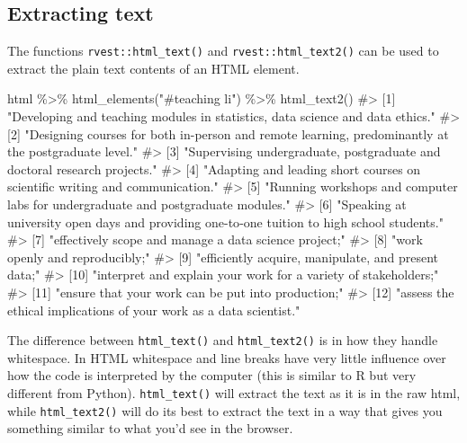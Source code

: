 \documentclass[
  letterpaper,
  DIV=11,
  numbers=noendperiod]{scrreprt}
\newenvironment{Shaded}{\begin{snugshade}}{\end{snugshade}}
\newcommand{\CommentTok}[1]{\textcolor[rgb]{0.37,0.37,0.37}{#1}}
\newcommand{\FunctionTok}[1]{\textcolor[rgb]{0.28,0.35,0.67}{#1}}
\newcommand{\NormalTok}[1]{\textcolor[rgb]{0.00,0.23,0.31}{#1}}
\newcommand{\SpecialCharTok}[1]{\textcolor[rgb]{0.37,0.37,0.37}{#1}}
\newcommand{\StringTok}[1]{\textcolor[rgb]{0.13,0.47,0.30}{#1}}
\begin{document}
\subsection{Extracting text}\label{extracting-text}

The functions \texttt{rvest::html\_text()} and
\texttt{rvest::html\_text2()} can be used to extract the plain text
contents of an HTML element.

\begin{Shaded}
\begin{Highlighting}[]
\NormalTok{html }\SpecialCharTok{\%\textgreater{}\%} 
  \FunctionTok{html\_elements}\NormalTok{(}\StringTok{"\#teaching li"}\NormalTok{) }\SpecialCharTok{\%\textgreater{}\%} 
  \FunctionTok{html\_text2}\NormalTok{()}
\CommentTok{\#\textgreater{}  [1] "Developing and teaching modules in statistics, data science and data ethics."                      }
\CommentTok{\#\textgreater{}  [2] "Designing courses for both in{-}person and remote learning, predominantly at the postgraduate level."}
\CommentTok{\#\textgreater{}  [3] "Supervising undergraduate, postgraduate and doctoral research projects."                           }
\CommentTok{\#\textgreater{}  [4] "Adapting and leading short courses on scientific writing and communication."                       }
\CommentTok{\#\textgreater{}  [5] "Running workshops and computer labs for undergraduate and postgraduate modules."                   }
\CommentTok{\#\textgreater{}  [6] "Speaking at university open days and providing one{-}to{-}one tuition to high school students."        }
\CommentTok{\#\textgreater{}  [7] "effectively scope and manage a data science project;"                                              }
\CommentTok{\#\textgreater{}  [8] "work openly and reproducibly;"                                                                     }
\CommentTok{\#\textgreater{}  [9] "efficiently acquire, manipulate, and present data;"                                                }
\CommentTok{\#\textgreater{} [10] "interpret and explain your work for a variety of stakeholders;"                                    }
\CommentTok{\#\textgreater{} [11] "ensure that your work can be put into production;"                                                 }
\CommentTok{\#\textgreater{} [12] "assess the ethical implications of your work as a data scientist."}
\end{Highlighting}
\end{Shaded}

The difference between \texttt{html\_text()} and \texttt{html\_text2()}
is in how they handle whitespace. In HTML whitespace and line breaks
have very little influence over how the code is interpreted by the
computer (this is similar to R but very different from Python).
\texttt{html\_text()} will extract the text as it is in the raw html,
while \texttt{html\_text2()} will do its best to extract the text in a
way that gives you something similar to what you'd see in the browser.
\end{document}
